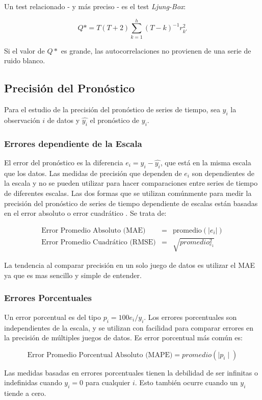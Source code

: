 \begin{spacing}{1.5}
Un test relacionado - y más preciso - es el test \emph{Ljung-Box}:

\[ Q* = T(T+2) \sum_{k=1}^{h}(T-k)^{-1}r_{k\prime}^{2} \]

Si el valor de $Q*$ es grande, las autocorrelaciones no provienen de una serie de ruido blanco. 

\subsection{Precisión del Pronóstico}
Para el estudio de la precisión del pronóstico de series de tiempo, sea $y_i$ la observación $i$ de datos y $\hat{y_i}$ el pronóstico de $y_i$.

\subsubsection{Errores dependiente de la Escala}
El error del pronóstico es la diferencia $e_i = y_i - \hat{y_i}$, que está en la misma escala que los datos. Las medidas de precisión que dependen de $e_i$ son dependientes de la escala y no se pueden utilizar para hacer comparaciones entre series de tiempo de diferentes escalas. Las dos formas que se utilizan comúnmente para medir la precisión del pronóstico de series de tiempo dependiente de escalas están basadas en el error absoluto o error cuadrático \cite{hyndman}. Se trata de:

\begin{eqnarray*}
	\text{Error Promedio Absoluto (MAE)}& = &\text{promedio}(|e_{i}|) \\
	\text{Error Promedio Cuadrático (RMSE)}& = &\sqrt{promedio_{e_1}^2} 
\end{eqnarray*}

La tendencia al comparar precisión en un solo juego de datos es utilizar el MAE ya que es mas sencillo y simple de entender. 

\subsubsection{Errores Porcentuales}
Un error porcentual es del tipo $p_i = 100 e_i / y_i$. Los errores porcentuales son independientes de la escala, y se utilizan con facilidad para comparar errores en la precisión de múltiples juegos de datos. Es error porcentual más común es:

\[ \text{Error Promedio Porcentual Absoluto (MAPE)} = promedio(\mid p_i \mid) \]

Las medidas basadas en errores porcentuales tienen la debilidad de ser infinitas o indefinidas cuando $y_i = 0$ para cualquier $i$. Esto también ocurre cuando un $y_i$ tiende a cero. 


\end{spacing}
